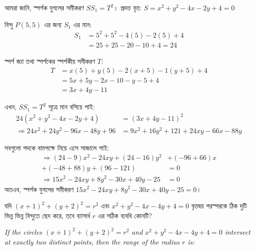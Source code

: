 \documentclass[12pt, a4paper]{article}
\begin{document}
\begin{tcolorbox}[solutionbox={সমাধান (Solution)}]
    \noindent
    আমরা জানি, স্পর্শক যুগলের সমীকরণ $SS_1 = T^2$। 
    প্রদত্ত বৃত্ত: $S = x^2 + y^2 - 4x - 2y + 4 = 0$ 
    
    বিন্দু $P(5, 5)$ এর জন্য $S_1$ এর মান:
    \begin{align*}
        S_1 &= 5^2 + 5^2 - 4(5) - 2(5) + 4 \\
            &= 25 + 25 - 20 - 10 + 4 = 24
    \end{align*}
    
    স্পর্শ জ্যা তথা স্পর্শকের স্পর্শকীয় সমীকরণ $T$:
    \begin{align*}
        T &= x(5) + y(5) - 2(x + 5) - 1(y + 5) + 4 \\
          &= 5x + 5y - 2x - 10 - y - 5 + 4 \\
          &= 3x + 4y - 11
    \end{align*}
    
    এখন, $SS_1 = T^2$ সূত্রে মান বসিয়ে পাই:
    \begin{align*}
        24(x^2 + y^2 - 4x - 2y + 4) &= (3x + 4y - 11)^2 \\
        \Rightarrow 24x^2 + 24y^2 - 96x - 48y + 96 &= 9x^2 + 16y^2 + 121 + 24xy - 66x - 88y
    \end{align*}
    
    সবগুলো পদকে বামপক্ষে নিয়ে এসে সাজালে পাই:
    \begin{align*}
        \Rightarrow (24 - 9)x^2 - 24xy + (24 - 16)y^2 &+ (-96 + 66)x \\
        + (-48 + 88)y + (96 - 121) &= 0 \\
        \Rightarrow 15x^2 - 24xy + 8y^2 - 30x + 40y - 25 &= 0
    \end{align*}
    অতএব, স্পর্শক যুগলের সমীকরণ \textbf{$15x^2 - 24xy + 8y^2 - 30x + 40y - 25 = 0$}।
\end{tcolorbox}

\vspace{2em}

\begin{tcolorbox}[questionbox={প্রশ্ন (Question) 27}]
    \noindent
    যদি $(x + 1)^2 + (y + 2)^2 = r^2$ এবং $x^2 + y^2 - 4x - 4y + 4 = 0$ বৃত্তদ্বয় পরস্পরকে ঠিক দুটি ভিন্ন ভিন্ন বিন্দুতে ছেদ করে, তবে ব্যাসার্ধ $r$ এর সঠিক ব্যবধি কোনটি?
    
    \vspace{0.8em}
    \begin{english}
    \noindent\textit{\color{darkgray}
    If the circles $(x + 1)^2 + (y + 2)^2 = r^2$ and $x^2 + y^2 - 4x - 4y + 4 = 0$ intersect at exactly two distinct points, then the range of the radius $r$ is:
    }
    \end{english}
\end{tcolorbox}
\end{document}
